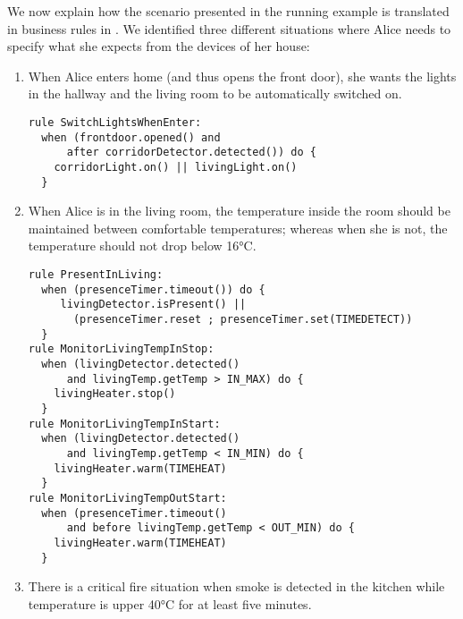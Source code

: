 We now explain how the scenario presented in the running example is translated in business rules in \IOTDSL. We identified three different situations where Alice needs to specify what she expects from the devices of her house:
\begin{enumerate}
	\item When Alice enters home (and thus opens the front door), she wants the lights in the hallway and the living room to be automatically switched on. 

\begin{lstlisting}[language=iotdsl]
rule SwitchLightsWhenEnter:
  when (frontdoor.opened() and 
      after corridorDetector.detected()) do {
    corridorLight.on() || livingLight.on()
  }
\end{lstlisting}	
	
	\item When Alice is in the living room, the temperature inside the room should be maintained between comfortable temperatures; whereas when she is not, the temperature should not drop below 16°C.
	
	
\begin{lstlisting}[language=iotdsl]
rule PresentInLiving:	
  when (presenceTimer.timeout()) do {
     livingDetector.isPresent() || 
       (presenceTimer.reset ; presenceTimer.set(TIMEDETECT))
  }
rule MonitorLivingTempInStop:
  when (livingDetector.detected() 
      and livingTemp.getTemp > IN_MAX) do {
    livingHeater.stop()
  }
rule MonitorLivingTempInStart:
  when (livingDetector.detected() 
      and livingTemp.getTemp < IN_MIN) do {
    livingHeater.warm(TIMEHEAT)
  }
rule MonitorLivingTempOutStart:
  when (presenceTimer.timeout() 
      and before livingTemp.getTemp < OUT_MIN) do {
    livingHeater.warm(TIMEHEAT)
  }
\end{lstlisting}
	
	\item There is a critical fire situation when smoke is detected in the kitchen while temperature is upper 40°C for at least five minutes.
\end{enumerate}


